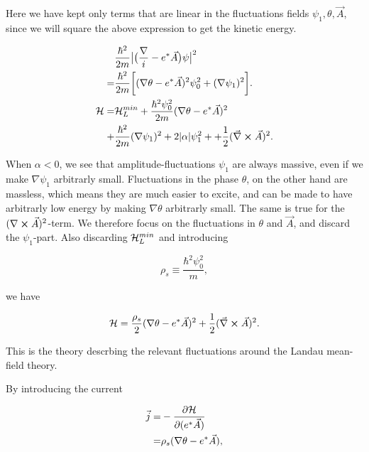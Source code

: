 Here we have kept only terms that are linear in the fluctuations fields $\psi_1, \theta, \vec{A}$, since we will square the above expression to get the kinetic energy. 

\begin{equation}
\begin{aligned}
&\frac{\hbar^2}{2m} \big|\big(\frac{\nabla}{i} - e^*\vec{A}\big)\psi \big|^2 \\
=& \frac{\hbar^2}{2m} \bigg[ (\nabla \theta - e^* \vec{A} )^2 \psi_0^2 + (\nabla \psi_1)^2 \bigg]. \\
\mathcal{H} =& \mathcal{H}_L^{min} + \frac{\hbar^2 \psi_0^2}{2m} (\nabla \theta - e^* \vec{A} )^2 \\
 +& \frac{\hbar^2}{2m} (\nabla \psi_1)^2 + 2|\alpha| \psi_1^2 + + \frac{1}{2}(\vec{\nabla} \cross \vec{A} )^2.
\label{H_fluc}
\end{aligned}
\end{equation}

When $\alpha<0$, we see that amplitude-fluctuations $\psi_1$ are always massive, even if we make $\nabla \psi_1$ arbitrarly small. Fluctuations in the phase $\theta$, on the other hand are massless, which means they are much easier to excite, and can be made to have arbitrarly low energy by making $\nabla \theta$ arbitrarly small. The same is true for the $(\nabla \cross \vec{A})^2$-term. We therefore focus on the fluctuations in $\theta$ and $\vec{A}$, and discard the $\psi_1$-part.  Also discarding $\mathcal{H}_L^{min}$ and introducing 

\begin{equation}
\rho_s \equiv \frac{\hbar^2 \psi_0^2}{m},
\end{equation}

we have 

\begin{equation}
\mathcal{H} = \frac{\rho_s}{2}  (\nabla \theta - e^* \vec{A} )^2 + \frac{1}{2}(\vec{\nabla} \cross \vec{A} )^2.
\label{Ham_rel_fluc} 
\end{equation}

This is the theory descrbing the relevant fluctuations around the Landau mean-field theory.

By introducing the current 



\begin{equation}
\begin{aligned}
\vec{j} =& - \frac{\partial \mathcal{H}}{\partial (e^* \vec{A})} \\
=& \rho_s (\nabla \theta - e^*\vec{A}),
\end{aligned}
\end{equation}


